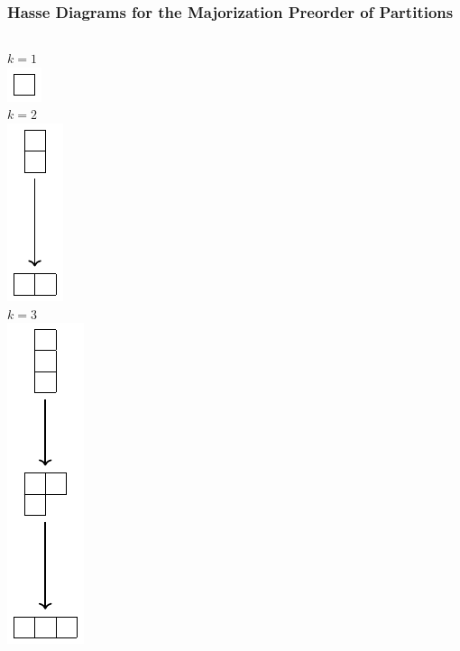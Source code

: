 \documentclass[
    9pt,
    hyperref={bookmarks=false, colorlinks=false}, %
    xcolor={dvipsnames},
]{beamer}
\begin{document}
\begin{frame}
    \frametitle{Hasse Diagrams for the Majorization Preorder of Partitions}
    \begin{columns}
        \begin{column}{0.25\textwidth}
            \begin{center}
                $k=1$ \\
                \includegraphics[scale=0.4]{figures/majorization_k_1.pdf} \\
                \vspace{1em}
                $k=2$ \\
                \includegraphics[scale=0.4]{figures/majorization_k_2.pdf} \\
                \vspace{1em}
                $k=3$ \\
                \includegraphics[scale=0.4]{figures/majorization_k_3.pdf}
            \end{center}

\end{column}
\end{columns}
\end{frame}
\end{document}

